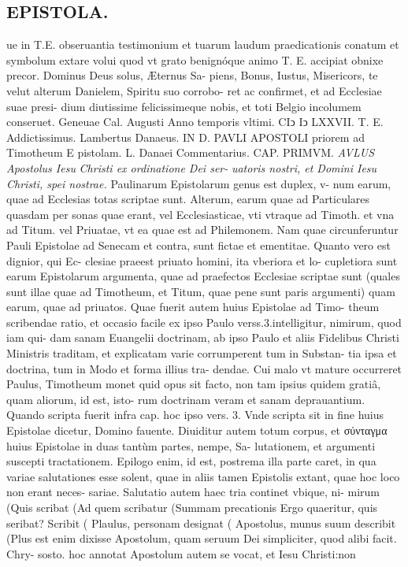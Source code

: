 \documentclass{article}
\begin{document}
\begin{pages}
\section*{EPISTOLA. }ue in T.E. obseruantia testimonium et tuarum laudum praedicationis conatum et symbolum extare volui quod vt grato benignóque animo T. E. accipiat obnixe precor. Dominus Deus solus, Æternus Sa- piens, Bonus, Iustus, Misericors, te velut alterum Danielem, Spiritu suo corrobo- ret ac confirmet, et ad Ecclesiae suae presi- dium diutissime felicissimeque nobis, et toti Belgio incolumem conseruet. Geneuae Cal. Augusti Anno temporis vltimi. CIↄ Iↄ LXXVII. T. E. Addictissimus.  Lambertus Danaeus. IN D. PAVLI APOSTOLI priorem ad Timotheum E pistolam. L. Danaei Commentarius. CAP. PRIMVM. \textit{AVLUS Apostolus Iesu} \textit{Christi ex ordinatione Dei ser-} \textit{uatoris nostri, et Domini Iesu} \textit{Christi, spei nostrae.} Paulinarum Epistolarum genus est duplex, v- num earum, quae ad Ecclesias totas scriptae sunt. Alterum, earum quae ad Particulares quasdam per sonas quae erant, vel Ecclesiasticae, vti vtraque ad Timoth. et vna ad Titum. vel Priuatae, vt ea quae est ad Philemonem. Nam quae circunferuntur Pauli Epistolae ad Senecam et contra, sunt fictae et ementitae. Quanto vero est dignior, qui Ec- clesiae praeest priuato homini, ita vberiora et lo- cupletiora sunt earum Epistolarum argumenta, quae ad praefectos Ecclesiae scriptae sunt (quales sunt illae quae ad Timotheum, et Titum, quae pene sunt paris argumenti) quam earum, quae ad 
\textbf{}
\marginpar{[ p.2 ]}priuatos. Quae fuerit autem huius Epistolae ad Timo- theum scribendae ratio, et occasio facile ex ipso Paulo verss.3.intelligitur, nimirum, quod iam qui- dam sanam Euangelii doctrinam, ab ipso Paulo et aliis Fidelibus Christi Ministris traditam, et explicatam varie corrumperent tum in Substan- tia ipsa et doctrina, tum in Modo et forma illius tra- dendae. Cui malo vt mature occurreret Paulus, Timotheum monet quid opus sit facto, non tam ipsius quidem gratiâ, quam aliorum, id est, isto- rum doctrinam veram et sanam deprauantium. Quando scripta fuerit infra cap. hoc ipso vers. 3. Vnde scripta sit in fine huius Epistolae dicetur, Domino fauente. Diuiditur autem totum corpus, et σύνταγμα huius Epistolae in duas tantùm partes, nempe, Sa- lutationem, et argumenti suscepti tractationem. Epilogo enim, id est, postrema illa parte caret, in qua variae salutationes esse solent, quae in aliis tamen Epistolis extant, quae hoc loco non erant neces- sariae. Salutatio autem haec tria continet vbique, ni- mirum (Quis scribat (Ad quem scribatur (Summam precationis Ergo quaeritur, quis seribat? Scribit ( Plaulus, personam designat ( Apostolus, munus suum describit (Plus est enim dixisse Apostolum, quam seruum Dei simpliciter, quod alibi facit. Chry- sosto. hoc annotat Apostolum autem se vocat, et Iesu Christi:non 

\end{pages}
\end{document}
